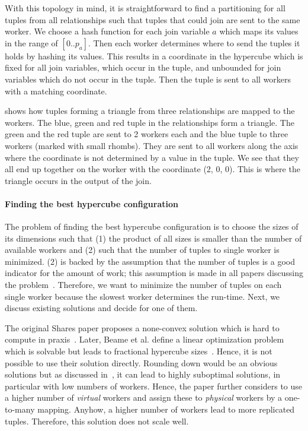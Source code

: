 With this topology in mind, it is straightforward to find a partitioning for all tuples from all relationships such that tuples that
could join are sent to the same worker.
We choose a hash function for each join variable $a$ which maps its values in the range of $[0..p_a]$.
Then each worker determines where to send the tuples it holds by hashing its values.
This results in a coordinate in the hypercube which is fixed for all join variables, which occur in the tuple, and unbounded for join
variables which do not occur in the tuple.
Then the tuple is sent to all workers with a matching coordinate.

 shows how tuples forming a triangle from three relationships are mapped to the workers.
The blue, green and red tuple in the relationships form a triangle.
The green and the red tuple are sent to 2 workers each and the blue tuple to three workers (marked with small rhombs).
They are sent to all workers along the axis where the coordinate is not determined by a value in the tuple.
We see that they all end up together on the worker with the coordinate (2, 0, 0).
This is where the triangle occurs in the output of the join.

\paragraph{Finding the best hypercube configuration}
The problem of finding the best hypercube configuration is to choose the sizes of its dimensions such that (1) the product of
all sizes is smaller than the number of available workers and (2) such that the number of tuples to single worker is minimized.
(2) is backed by the assumption that the number of tuples is a good indicator for the amount of work;
this assumption is made in all papers discussing the problem~\cite{myria-detailed,shares-proof,shares}.
Therefore, we want to minimize the number of tuples on each single worker because the slowest worker determines the run-time.
Next, we discuss existing solutions and decide for one of them.

The original Shares paper proposes a none-convex solution which is hard to compute in praxis~\cite{shares}.
Later, Beame et al. define a linear optimization problem which is solvable but leads to fractional hypercube
sizes~\cite{shares-proof}.
Hence, it is not possible to use their solution directly.
Rounding down would be an obvious solutions but as discussed in~\cite{myria-detailed}, it can lead to highly suboptimal solutions, in
particular with low numbers of workers.
Hence, the paper further considers to use a higher number of \textit{virtual} workers and assign these to \textit{physical} workers
by a one-to-many mapping.
Anyhow, a higher number of workers lead to more replicated tuples.
Therefore, this solution does not scale well.

